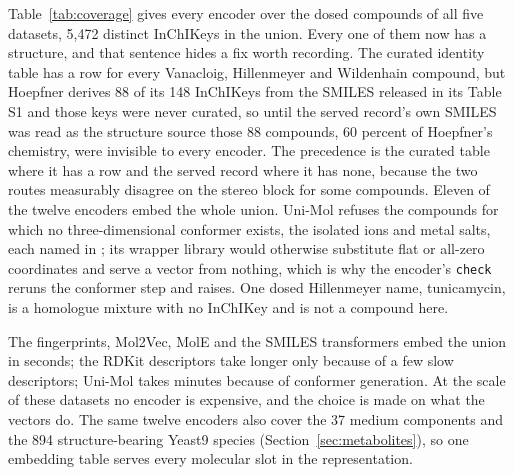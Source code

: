 Table~\ref{tab:coverage} gives every encoder over the dosed compounds of all five datasets,
5{,}472 distinct InChIKeys in the union. Every one of them now has a structure, and that
sentence hides a fix worth recording. The curated identity table has a row for every
Vanacloig, Hillenmeyer and Wildenhain compound, but Hoepfner derives 88 of its 148 InChIKeys
from the SMILES released in its Table S1 and those keys were never curated, so until the
served record's own SMILES was read as the structure source those 88 compounds, 60 percent of
Hoepfner's chemistry, were invisible to every encoder. The precedence is the curated table
where it has a row and the served record where it has none, because the two routes measurably
disagree on the stereo block for some compounds. Eleven of the twelve encoders embed the whole
union. Uni-Mol refuses the compounds for which no three-dimensional conformer exists, the
isolated ions and metal salts, each named in ; its
wrapper library would otherwise substitute flat or all-zero coordinates and serve a vector
from nothing, which is why the encoder's \texttt{check} reruns the conformer step and raises.
One dosed Hillenmeyer name, tunicamycin, is a homologue mixture with no InChIKey and is not a
compound here.

\begin{table}[htbp]
\centering
\footnotesize
\caption{Coverage of every encoder over the dosed compounds of the five datasets (distinct
InChIKeys with a dosed record). The last column is wall time in seconds to embed the 5{,}472
compounds of the union on one shared GPU, model load excluded.}
\label{tab:coverage}

\end{table}

The fingerprints, Mol2Vec, MolE and the SMILES transformers embed the union in seconds; the
RDKit descriptors take longer only because of a few slow descriptors; Uni-Mol takes minutes
because of conformer generation. At the scale of these datasets no encoder is expensive, and
the choice is made on what the vectors do. The same twelve encoders also cover the 37 medium
components and the 894 structure-bearing Yeast9 species (Section~\ref{sec:metabolites}), so
one embedding table serves every molecular slot in the representation.

